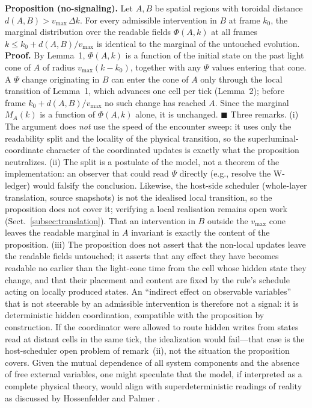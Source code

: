 \documentclass{ijuc}
\begin{document}
\textbf{Proposition (no-signaling).}  Let $A,B$ be spatial regions with toroidal distance $d(A,B)>v_{\max}\,\Delta k$.  For every admissible intervention in $B$ at frame $k_{0}$, the marginal distribution over the readable fields $\Phi(A,k)$ at all frames $k\le k_{0}+d(A,B)/v_{\max}$ is identical to the marginal of the untouched evolution.
\textbf{Proof.}  By Lemma~1, $\Phi(A,k)$ is a function of the initial state on the past light cone of $A$ of radius $v_{\max}(k-k_{0})$, together with any $\Psi$ values entering that cone.  A $\Psi$ change originating in $B$ can enter the cone of $A$ only through the local transition of Lemma~1, which advances one cell per tick (Lemma~2); before frame $k_{0}+d(A,B)/v_{\max}$ no such change has reached $A$.  Since the marginal $M_{A}(k)$ is a function of $\Phi(A,k)$ alone, it is unchanged. \hfill$\blacksquare$
Three remarks.  (i) The argument does \emph{not} use the speed of the encounter sweep: it uses only the readability split and the locality of the physical transition, so the superluminal-coordinate character of the coordinated updates is exactly what the proposition neutralizes.  (ii) The split is a postulate of the model, not a theorem of the implementation: an observer that could read $\Psi$ directly (e.g., resolve the W-ledger) would falsify the conclusion.  Likewise, the host-side scheduler (whole-layer translation, source snapshots) is not the idealised local transition, so the proposition does not cover it; verifying a local realisation remains open work (Sect.~\ref{subsec:translation}).  That an intervention in $B$ outside the $v_{\max}$ cone leaves the readable marginal in $A$ invariant is exactly the content of the proposition.  (iii) The proposition does not assert that the non-local updates leave the readable fields untouched; it asserts that any effect they have becomes readable no earlier than the light-cone time from the cell whose hidden state they change, and that their placement and content are fixed by the rule's schedule acting on locally produced states.  An ``indirect effect on observable variables'' that is not steerable by an admissible intervention is therefore not a signal: it is deterministic hidden coordination, compatible with the proposition by construction.  If the coordinator were allowed to route hidden writes from states read at distant cells in the same tick, the idealization would fail---that case is the host-scheduler open problem of remark~(ii), not the situation the proposition covers.
Given the mutual dependence of all system components and the absence of free external variables, one might speculate that the model, if interpreted as a complete physical theory, would align with superdeterministic readings of reality as discussed by Hossenfelder and Palmer \cite{hossenfelder2020rethinking}.
\end{document}
